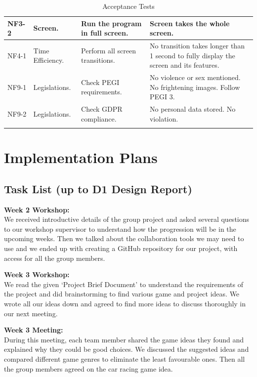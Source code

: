 \documentclass[12pt]{article}
\begin{document}
\begin{longtable}{|l|p{}|p{}|p{}|}
NF3-2 & Screen. &
Run the program in full screen. &
Screen takes the whole screen. \\
\hline

NF4-1 & Time Efficiency. &
Perform all screen transitions. &
No transition takes longer than 1 second to fully display the screen and its features. \\
\hline

NF9-1 & Legislations. &
Check PEGI requirements. &
No violence or sex mentioned. No frightening images. Follow PEGI 3. \\
\hline

NF9-2 & Legislations. &
Check GDPR compliance. &
No personal data stored. No violation. \\
\hline

\caption{Acceptance Tests}
\end{longtable}

\endgroup


\section{Implementation Plans}

\subsection{Task List (up to D1 Design Report)}

\noindent\textbf{Week 2 Workshop:}\\
We received introductive details of the group project and asked several questions to our workshop supervisor to understand how the progression will be in the upcoming weeks. Then we talked about the collaboration tools we may need to use and we ended up with creating a GitHub repository for our project, with access for all the group members.

\noindent\textbf{Week 3 Workshop:}\\
We read the given ‘Project Brief Document’ to understand the requirements of the project and did brainstorming to find various game and project ideas. We wrote all our ideas down and agreed to find more ideas to discuss thoroughly in our next meeting.

\noindent\textbf{Week 3 Meeting:}\\
During this meeting, each team member shared the game ideas they found and explained why they could be good choices. We discussed the suggested ideas and compared different game genres to eliminate the least favourable ones. Then all the group members agreed on the car racing game idea.
\end{document}
